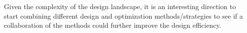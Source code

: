 Given the complexity of the design landscape, it is an interesting direction to start combining different design and optimization methods/strategies to see if a collaboration of the methods could further improve the design efficiency. 



\begin{comment}
\textbf{SP}
In the examples we have examined so far, if use SPC as a global optimization tool, it should be OK to start from any of the existing solution to obtain the global optimum (or arrive at the region of the global optimia). 

To prove that the SPC network can always capture the good solutions given a design landscape. That is to say, for the region of the good solutions, the design landscape is structured in a way that SPC network is mapping the saddle point - minima network. 
It requires a deeper investigation of the design landscape. To start with, I would suggest to use a certain type of system and to characterize its landscape (in the thesis, we have been looking at wide-angle and microscope objectives). 

It is a difficult task.



In addition, since the property for SPC is not constrained to lens design using curvatures, trying to adapt it into other design and optimization area is also interesting.
1) using variables such as thickness, higher-order surface description
2) benefit of constructing higher-order saddle points
3) apply SPC in other design problem, e.g. thin film (zero-thickness, using n as variables, phase-mask)


\textbf{lens design opt}
1) In the search of lens design method, combining multiple strategies would be beneficial rather than only using one. 
Lens design optimization strategy given the complex landscape




//////////
Saddle point wise, 
1) what is the optimal construction place by comparing the curve change via the inserting positions. 

For simple system, it is interesting to see the design networks mostly related to the saddle point network. Few number of lens is used, not much constraint is applied to the system. 

For complicated system, mapping the network via saddle point becomes less value-added. What is sure the basic saddle point-minima approach is mostly fulfilled. 


\end{comment}
